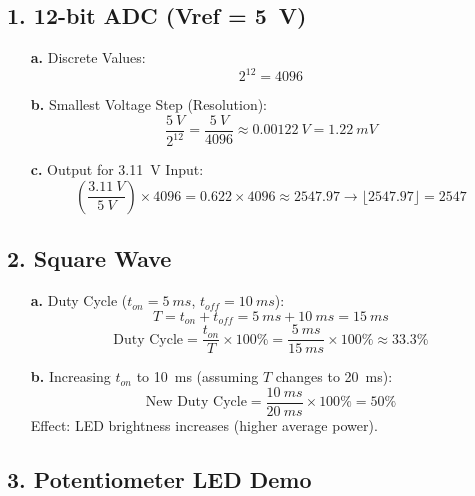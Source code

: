 \documentclass{article}
\begin{document}
\subsection*{1. 12-bit ADC (Vref = \SI{5}{V})}
\begin{enumerate}
    \item[\bfseries a.] Discrete Values:
        \[ 2^{12} = 4096 \]
    \item[\bfseries b.] Smallest Voltage Step (Resolution):
        \[ \frac{\SI{5}{V}}{2^{12}} = \frac{\SI{5}{V}}{4096} \approx \SI{0.00122}{V} = \SI{1.22}{mV} \]
    \item[\bfseries c.] Output for \SI{3.11}{V} Input:
        \[ \left( \frac{\SI{3.11}{V}}{\SI{5}{V}} \right) \times 4096 = 0.622 \times 4096 \approx 2547.97 \rightarrow \lfloor 2547.97 \rfloor = 2547 \]
\end{enumerate}

\subsection*{2. Square Wave}
\begin{enumerate}
    \item[\bfseries a.] Duty Cycle ($t_{on} = \SI{5}{ms}$, $t_{off} = \SI{10}{ms}$):
        \[ T = t_{on} + t_{off} = \SI{5}{ms} + \SI{10}{ms} = \SI{15}{ms} \]
        \[ \text{Duty Cycle} = \frac{t_{on}}{T} \times 100\% = \frac{\SI{5}{ms}}{\SI{15}{ms}} \times 100\% \approx 33.3\% \]
    \item[\bfseries b.] Increasing $t_{on}$ to \SI{10}{ms} (assuming $T$ changes to \SI{20}{ms}):
        \[ \text{New Duty Cycle} = \frac{\SI{10}{ms}}{\SI{20}{ms}} \times 100\% = 50\% \]
        Effect: LED brightness increases (higher average power).
\end{enumerate}

\subsection*{3. Potentiometer LED Demo}
\end{document}
